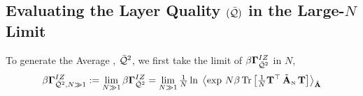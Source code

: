 \subsection{Evaluating the Layer Quality \texorpdfstring{$(\bar{\mathcal{Q}})$}{Q} in the Large-\texorpdfstring{$N$}{N} Limit}
\label{sxn:matgen_evaluation_hciz}

To generate the Average \Quality, $\bar{\mathcal{Q}}^{2}$, we first take the \LargeN limit of $\beta\mathbf{\Gamma}^{IZ}_{\bar{\mathcal{Q}}^{2}}$ in $N$,
\begin{equation}
  \label{eqn:IZG_limit}
\IZGINF := \lim_{N \gg 1} \IZG 
= \lim_{N \gg 1}  \tfrac{1}{N}
\ln \; 
  \Expected[\AECS]{ 
    \exp\,
      N \beta \Trace{\tfrac{1}{N}\TMAT^{\top}\,\AECSN\,\TMAT}
  } 
\end{equation}
